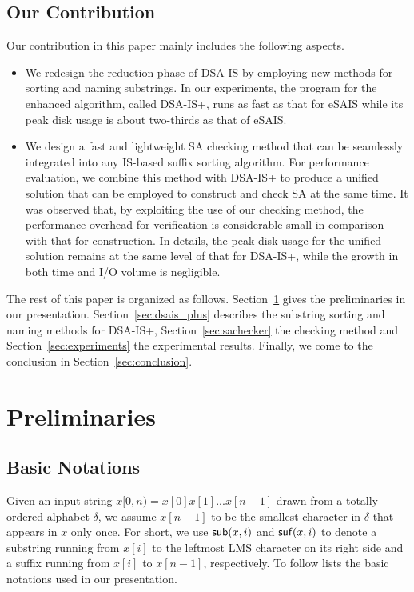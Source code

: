 \documentclass[10pt,journal,compsoc]{IEEEtran}
\begin{document}
\subsection{Our Contribution}

Our contribution in this paper mainly includes the following aspects.

\begin{itemize}
	
	\item We redesign the reduction phase of DSA-IS by employing new methods for sorting and naming substrings. In our experiments, the program for the enhanced algorithm, called DSA-IS+, runs as fast as that for eSAIS while its peak disk usage is about two-thirds as that of eSAIS.
	
	\item We design a fast and lightweight SA checking method that can be seamlessly integrated into any IS-based suffix sorting algorithm. For performance evaluation, we combine this method with DSA-IS+ to produce a unified solution that can be employed to construct and check SA at the same time. It was observed that, by exploiting the use of our checking method, the performance overhead for verification is considerable small in comparison with that for construction. In details, the peak disk usage for the unified solution remains at the same level of that for DSA-IS+, while the growth in both time and I/O volume is negligible.
	
\end{itemize}

The rest of this paper is organized as follows. Section~\ref{sec:preliminary} gives the preliminaries in our presentation. Section~\ref{sec:dsais_plus} describes the substring sorting and naming methods for DSA-IS+, Section~\ref{sec:sachecker} the checking method and Section~\ref{sec:experiments} the experimental results. Finally, we come to the conclusion in Section~\ref{sec:conclusion}.

\section{Preliminaries}\label{sec:preliminary}

\subsection{Basic Notations}

Given an input string $x[0,n)=x[0]x[1]...x[n - 1]$ drawn from a totally ordered alphabet $\delta$, we assume $x[n - 1]$ to be the smallest character in $\delta$ that appears in $x$ only once. For short, we use ${\sf sub}(x,i)$ and ${\sf suf}(x,i)$ to denote a substring running from $x[i]$ to the leftmost LMS character on its right side and a suffix running from $x[i]$ to $x[n - 1]$, respectively. To follow lists the basic notations used in our presentation.
\end{document}
